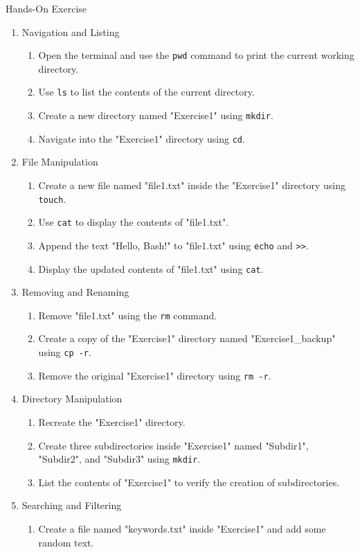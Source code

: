\documentclass[ignorenonframetext,xcolor=dvipsnames]{beamer}
\begin{document}
\begin{frame}[allowframebreaks]{Hands-On Exercise}
\begin{enumerate}
\item Navigation and Listing
\begin{enumerate}
	\item Open the terminal and use the \texttt{pwd} command to print the current working directory.
	\item Use \texttt{ls} to list the contents of the current directory.
	\item Create a new directory named "Exercise1" using \texttt{mkdir}.
	\item Navigate into the "Exercise1" directory using \texttt{cd}.
\end{enumerate}
\item File Manipulation
\begin{enumerate}
	\item Create a new file named "file1.txt" inside the "Exercise1" directory using \texttt{touch}.
	\item Use \texttt{cat} to display the contents of "file1.txt".
	\item Append the text "Hello, Bash!" to "file1.txt" using \texttt{echo} and \texttt{>>}.
	\item Display the updated contents of "file1.txt" using \texttt{cat}.
\end{enumerate}
\item Removing and Renaming
\begin{enumerate}
	\item Remove "file1.txt" using the \texttt{rm} command.
	\item Create a copy of the "Exercise1" directory named "Exercise1\_backup" using \texttt{cp -r}.
	\item Remove the original "Exercise1" directory using \texttt{rm -r}.
\end{enumerate}
\item Directory Manipulation
\begin{enumerate}
	\item Recreate the "Exercise1" directory.
	\item Create three subdirectories inside "Exercise1" named "Subdir1", "Subdir2", and "Subdir3" using \texttt{mkdir}.
	\item List the contents of "Exercise1" to verify the creation of subdirectories.
\end{enumerate}
\item Searching and Filtering
\begin{enumerate}
	\item Create a file named "keywords.txt" inside "Exercise1" and add some random text.

\end{enumerate}
\end{enumerate}
\end{frame}
\end{document}
